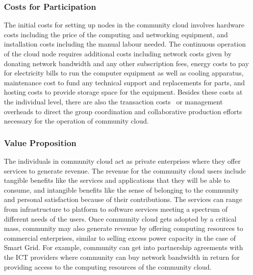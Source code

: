 \subsubsection{Costs for Participation}
The initial costs for setting up nodes in the community cloud involves hardware costs including the price of the computing and networking equipment, and installation costs including the manual labour needed.
The continuous operation of the cloud node requires additional costs including network costs given by donating network bandwidth and any other subscription fees, energy costs to pay for electricity bills to run the computer equipment as well as cooling apparatus, maintenance cost to fund any technical support and replacements for parts, and hosting costs to provide storage space for the equipment.
Besides these costs at the individual level, there are also the transaction costs~\cite{Coase1937} or management overheads to direct the group coordination and collaborative production efforts necessary for the operation of community cloud.

\subsubsection{Value Proposition} 
The individuals in community cloud act as private enterprises where they offer services to generate revenue. 
The revenue for the community cloud users include tangible benefits like the services and applications that they will be able to consume, and intangible benefits like the sense of belonging to the community and personal satisfaction because of their contributions.
The services can range from infrastructure to platform to software services meeting a spectrum of different needs of the users.
Once community cloud gets adopted by a critical mass, community may also generate revenue by offering computing resources to commercial enterprises, similar to selling excess power capacity in the case of Smart Grid.
For example, community can get into partnership agreements with the ICT providers where community can buy network bandwidth in return for providing access to the computing resources of the community cloud. 

